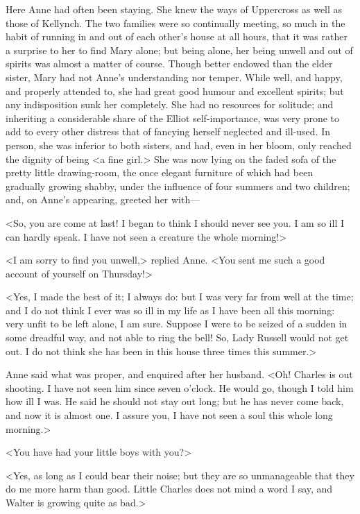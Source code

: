 Here Anne had often been staying. She knew the ways of Uppercross as well as those of Kellynch. The two families were so continually meeting, so much in the habit of running in and out of each other's house at all hours, that it was rather a surprise to her to find Mary alone; but being alone, her being unwell and out of spirits was almost a matter of course. Though better endowed than the elder sister, Mary had not Anne's understanding nor temper. While well, and happy, and properly attended to, she had great good humour and excellent spirits; but any indisposition sunk her completely. She had no resources for solitude; and inheriting a considerable share of the Elliot self-importance, was very prone to add to every other distress that of fancying herself neglected and ill-used. In person, she was inferior to both sisters, and had, even in her bloom, only reached the dignity of being <a fine girl.> She was now lying on the faded sofa of the pretty little drawing-room, the once elegant furniture of which had been gradually growing shabby, under the influence of four summers and two children; and, on Anne's appearing, greeted her with—

<So, you are come at last! I began to think I should never see you. I am so ill I can hardly speak. I have not seen a creature the whole morning!>

<I am sorry to find you unwell,> replied Anne. <You sent me such a good account of yourself on Thursday!>

<Yes, I made the best of it; I always do: but I was very far from well at the time; and I do not think I ever was so ill in my life as I have been all this morning: very unfit to be left alone, I am sure. Suppose I were to be seized of a sudden in some dreadful way, and not able to ring the bell! So, Lady Russell would not get out. I do not think she has been in this house three times this summer.>

Anne said what was proper, and enquired after her husband. <Oh! Charles is out shooting. I have not seen him since seven o'clock. He would go, though I told him how ill I was. He said he should not stay out long; but he has never come back, and now it is almost one. I assure you, I have not seen a soul this whole long morning.>

<You have had your little boys with you?>

<Yes, as long as I could bear their noise; but they are so unmanageable that they do me more harm than good. Little Charles does not mind a word I say, and Walter is growing quite as bad.>

